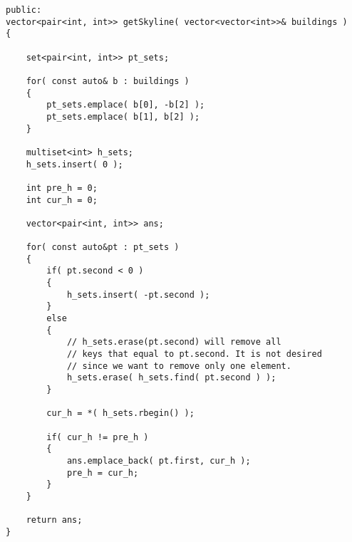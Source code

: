 \setcounter{lstlisting}{0}
\begin{lstlisting}[style=customc, caption={Sorting}]
public:
vector<pair<int, int>> getSkyline( vector<vector<int>>& buildings )
{

    set<pair<int, int>> pt_sets;

    for( const auto& b : buildings )
    {
        pt_sets.emplace( b[0], -b[2] );
        pt_sets.emplace( b[1], b[2] );
    }

    multiset<int> h_sets;
    h_sets.insert( 0 );

    int pre_h = 0;
    int cur_h = 0;

    vector<pair<int, int>> ans;

    for( const auto&pt : pt_sets )
    {
        if( pt.second < 0 )
        {
            h_sets.insert( -pt.second );
        }
        else
        {
            // h_sets.erase(pt.second) will remove all 
            // keys that equal to pt.second. It is not desired
            // since we want to remove only one element.
            h_sets.erase( h_sets.find( pt.second ) );
        }

        cur_h = *( h_sets.rbegin() );

        if( cur_h != pre_h )
        {
            ans.emplace_back( pt.first, cur_h );
            pre_h = cur_h;
        }
    }

    return ans;
}

\end{lstlisting}
